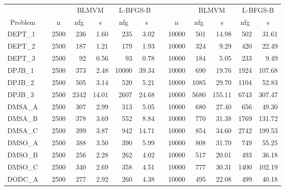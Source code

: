 \begin{table}[bhpt]
\begin{center}
\footnotesize
\begin{tabular}{|l|c|r|rr|rr|c|r|rr|rr|}
\hline
\multicolumn{1}{|c|}{} &
\multicolumn{1}{|c|}{} &
\multicolumn{1}{|c|}{} &
\multicolumn{2}{c|}{BLMVM} &
\multicolumn{2}{c|}{L-BFGS-B} &
\multicolumn{1}{|c|}{} &
\multicolumn{1}{|c|}{} &
\multicolumn{2}{c|}{BLMVM} &
\multicolumn{2}{c|}{L-BFGS-B} \\

\multicolumn{1}{|c|}{Problem}&
\multicolumn{1}{c|}{}&
\multicolumn{1}{c|}{n}&
\multicolumn{1}{c}{nfg}&
\multicolumn{1}{c|}{s}&
\multicolumn{1}{c}{nfg} &
\multicolumn{1}{c|}{s} &
\multicolumn{1}{c|}{}&
\multicolumn{1}{c|}{n}&
\multicolumn{1}{c}{nfg}&
\multicolumn{1}{c|}{s}&
\multicolumn{1}{c}{nfg} &
\multicolumn{1}{c|}{s} \\
\hline
DEPT\_1 & & 2500 &  236 & 1.60 &  235 &  3.02  &   & 10000 &  501 & 14.98 &  502 &  31.61  \\ 
DEPT\_2 & & 2500 &  187 & 1.21 &  179 &  1.93  &   & 10000 &  324 & 9.29 &  420 &  22.49  \\ 
DEPT\_3 & & 2500 &  92 & 0.56 &  93 &  0.78  &   & 10000 &  184 & 5.05 &  233 &  9.49  \\ 
DPJB\_1 & & 2500 &  373 & 2.48 &  10000 &  39.34  &   & 10000 &  690 & 19.76 &  1924 &  107.68  \\ 
DPJB\_2 & & 2500 &  505 & 3.14 &  520 &  5.21  &   & 10000 &  1085 & 29.70 &  1104 &  52.83  \\ 
DPJB\_3 & & 2500 &  2342 & 14.01 &  2607 &  24.68  &   & 10000 &  5680 & 155.11 &  6743 &  307.47  \\ 
DMSA\_A & & 2500 &  307 & 2.99 &  313 &  5.05  &   & 10000 &  680 & 27.40 &  656 &  49.30  \\ 
DMSA\_B & & 2500 &  378 & 3.69 &  552 &  8.84  &   & 10000 &  770 & 31.38 &  1769 &  131.72  \\ 
DMSA\_C & & 2500 &  399 & 3.87 &  942 &  14.71  &   & 10000 &  854 & 34.60 &  2742 &  199.53  \\ 
DMSO\_A & & 2500 &  388 & 3.50 &  390 &  5.99  &   & 10000 &  808 & 31.70 &  749 &  55.25  \\ 
DMSO\_B & & 2500 &  256 & 2.28 &  262 &  4.02  &   & 10000 &  517 & 20.01 &  493 &  36.18  \\ 
DMSO\_C & & 2500 &  340 & 2.69 &  358 &  4.51  &   & 10000 &  777 & 30.31 &  1400 &  102.19  \\ 
DODC\_A & & 2500 &  277 & 2.92 &  260 &  4.38  &   & 10000 &  495 & 22.08 &  499 &  40.18  \\ 

\end{tabular}
\end{center}
\end{table}
